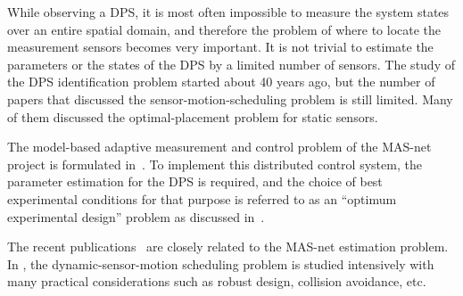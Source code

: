 While observing a DPS, it is most often impossible to measure the system states over an entire spatial domain, and therefore the problem of where to locate  the measurement sensors becomes very important.
    It is not trivial to estimate the parameters or the states of the DPS by a limited number of sensors. The study of the DPS identification problem started about 40 years ago, but the number of papers that discussed the sensor-motion-scheduling problem is still limited. Many of them discussed the optimal-placement problem for static sensors.


    The model-based adaptive measurement and control problem of the MAS-net project is formulated in~\cite{MASnetSPIE04ZoneControl,masnetspie04pathplan}. To implement this distributed control system, the parameter estimation for the DPS is required, and the choice of best experimental conditions for that purpose is referred to as an ``optimum experimental design'' problem as discussed in~\cite{MehraOED76,MullerOptimumDesign,RafajlowiczDesign78,Jaibook88}.

    The recent publications~\cite{UcinskiOptDPS05,Patan2004} are closely related to the MAS-net estimation problem. In \cite{UcinskiOptDPS05,Patan2004}, the dynamic-sensor-motion scheduling problem is studied intensively with many practical considerations such as robust design, collision avoidance, etc.


